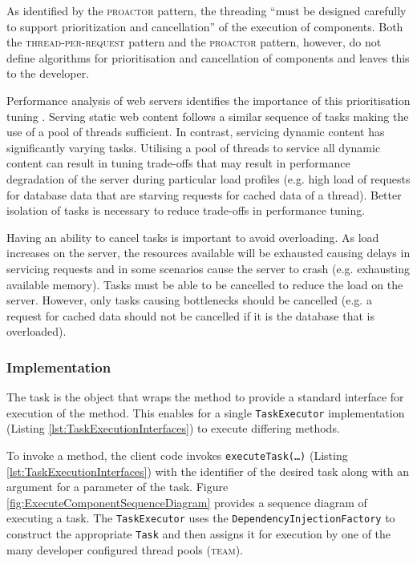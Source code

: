\documentclass[prodmode]{style/acmlarge}
\begin{document}
As identified by the \textsc{proactor} pattern, the threading ``must be designed
carefully to support prioritization and cancellation'' \cite[p. 8]{proactor} of
the execution of components.  Both the \textsc{thread-per-request} pattern and
the \textsc{proactor} pattern, however, do not define algorithms for
prioritisation and cancellation of components and leaves this to the developer.

Performance analysis of web servers identifies the importance of this
prioritisation tuning
\cite{tuning-important,low-server-footprint,tuning-os-important}.
Serving static web content follows a similar sequence of tasks making the use of
a pool of threads sufficient.  In contrast, servicing dynamic content has
significantly varying tasks.  Utilising a pool of threads to service all dynamic
content can result in tuning trade-offs that may result in performance
degradation of the server during particular load profiles (e.g. high load of
requests for database data that are starving requests for cached data of a
thread).  Better isolation of tasks is necessary to reduce trade-offs in
performance tuning.

Having an ability to cancel tasks is important to avoid overloading.  As
load increases on the server, the resources available will be exhausted causing
delays in servicing requests and in some scenarios cause the server to crash
(e.g. exhausting available memory).  Tasks must be able to be cancelled to
reduce the load on the server.  However, only tasks causing bottlenecks
should be cancelled (e.g. a request for cached data should not be cancelled if
it is the database that is overloaded).


\subsubsection*{Implementation}

The task is the object that wraps the method to provide a standard interface for
execution of the method.  This enables for a single \texttt{TaskExecutor}
implementation (Listing \ref{lst:TaskExecutionInterfaces}) to execute differing
methods.

To invoke a method, the client code invokes \texttt{executeTask(\ldots)}
(Listing \ref{lst:TaskExecutionInterfaces}) with the identifier of the desired
task along with an argument for a parameter of the task.  Figure
\ref{fig:ExecuteComponentSequenceDiagram} provides a sequence diagram of
executing a task.  The \texttt{TaskExecutor} uses the
\texttt{DependencyInjectionFactory} to construct the appropriate \texttt{Task}
and then assigns it for execution by one of the many developer configured thread
pools (\textsc{team}).
\end{document}
